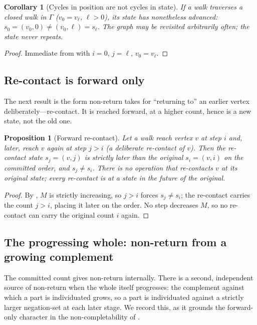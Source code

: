 \documentclass[11pt,a4paper]{article}
\theoremstyle{thmstyle}
\newtheorem{proposition}[theorem]{Proposition}
\newtheorem{corollary}[theorem]{Corollary}
\theoremstyle{definition}
\theoremstyle{remark}
\newcommand{\Gph}{\Gamma}                 %
\newcommand{\rec}{M}                      %
\begin{document}
\begin{corollary}[Cycles in position are not cycles in state]
\label{cor:cycles}
If a walk traverses a closed walk in $\Gph$ \textup{(}$v_0=v_\ell$, $\ell>0$\textup{)},
its state has nonetheless advanced: $s_0=(v_0,0)\neq(v_0,\ell)=s_\ell$. The graph
may be revisited arbitrarily often; the state never repeats.
\end{corollary}

\begin{proof}
Immediate from  with $i=0$, $j=\ell$, $v_0=v_\ell$.
\end{proof}

\subsection{Re-contact is forward only}

The next result is the form non-return takes for ``returning to'' an earlier
vertex deliberately---re-contact. It is reached forward, at a higher count, hence
is a new state, not the old one.

\begin{proposition}[Forward re-contact]
\label{prop:recontact}
Let a walk reach vertex $v$ at step $i$ and, later, reach $v$ again at step
$j>i$ \textup{(}a deliberate re-contact of $v$\textup{)}. Then the re-contact
state $s_j=(v,j)$ is strictly later than the original $s_i=(v,i)$ on the
committed order, and $s_j\neq s_i$. There is no operation that re-contacts $v$ at
its original state; every re-contact is at a state in the future of the original.
\end{proposition}

\begin{proof}
By , $\rec$ is strictly increasing, so $j>i$ forces
$s_j\neq s_i$; the re-contact carries the count $j>i$, placing it later on the
order. No step decreases $\rec$, so no re-contact can carry the original count
$i$ again.
\end{proof}

\subsection{The progressing whole: non-return from a growing complement}

The committed count gives non-return internally. There is a second, independent
source of non-return when the whole itself progresses: the complement against
which a part is individuated grows, so a part is individuated against a strictly
larger negation-set at each later stage. We record this, as it grounds the
forward-only character in the non-completability of .
\end{document}
